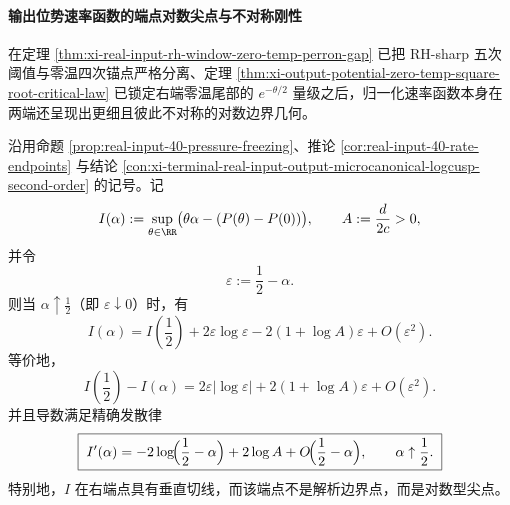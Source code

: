 \paragraph{输出位势速率函数的端点对数尖点与不对称刚性}
在定理 \ref{thm:xi-real-input-rh-window-zero-temp-perron-gap} 已把 RH-sharp 五次阈值与零温四次锚点严格分离、定理 \ref{thm:xi-output-potential-zero-temp-square-root-critical-law} 已锁定右端零温尾部的 \(e^{-\theta/2}\) 量级之后，归一化速率函数本身在两端还呈现出更细且彼此不对称的对数边界几何。

\begin{theorem}[输出位势速率函数在右端点具有显式对数尖点]\label{thm:xi-output-potential-rate-right-endpoint-log-cusp}
沿用命题 \ref{prop:real-input-40-pressure-freezing}、推论 \ref{cor:real-input-40-rate-endpoints} 与结论 \ref{con:xi-terminal-real-input-output-microcanonical-logcusp-second-order} 的记号。记
\[
I(\alpha):=\sup_{\theta\in\RR}\bigl(\theta\alpha-(P(\theta)-P(0))\bigr),
\qquad
A:=\frac{d}{2c}>0,
\]
并令
\[
\varepsilon:=\frac12-\alpha.
\]
则当 \(\alpha\uparrow \frac12\)（即 \(\varepsilon\downarrow 0\)）时，有
\[
\boxed{\;
I(\alpha)
=
I\!\left(\frac12\right)
+2\varepsilon\log\varepsilon
-2(1+\log A)\varepsilon
+O(\varepsilon^2).\;}
\]
等价地，
\[
\boxed{\;
I\!\left(\frac12\right)-I(\alpha)
=
2\varepsilon|\log\varepsilon|
+2(1+\log A)\varepsilon
+O(\varepsilon^2).\;}
\]
并且导数满足精确发散律
\[
\boxed{\;
I'(\alpha)
=
-2\log\!\Bigl(\frac12-\alpha\Bigr)+2\log A+O\!\Bigl(\frac12-\alpha\Bigr),
\qquad
\alpha\uparrow \frac12.\;}
\]
特别地，\(I\) 在右端点具有垂直切线，而该端点不是解析边界点，而是对数型尖点。
\end{theorem}
